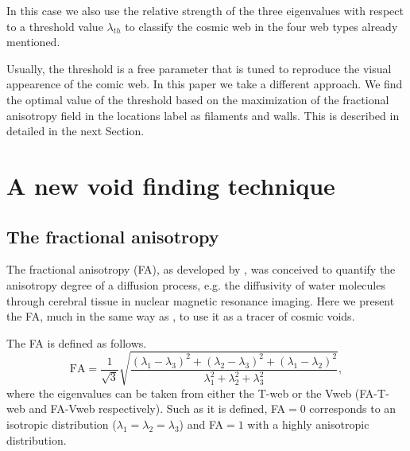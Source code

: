 \documentclass[a4,useAMS,usenatbib,usegraphicx]{mn2e}
\newcommand{\eq}[2]{\begin{equation} \label{eq:#1} #2 \end{equation}}
\begin{document}
In this case we also use the relative strength of the three eigenvalues with 
respect to a threshold value $\lambda_{th}$ to classify the cosmic web
in the four web types already mentioned.

Usually, the threshold is a free parameter that is tuned to reproduce
the visual appearence of the comic web. 
In this paper we take a different approach.
We find the optimal value of the threshold based on the maximization
of the fractional anisotropy field in the locations label as filaments
and walls. 
This is described in detailed in the next Section.



\section{A new void finding technique}
\label{sec:bulk_voids}


\subsection{The fractional anisotropy}
\label{subsec:FA_voids}


The fractional anisotropy (FA), as developed by \citet{Basser95}, was 
conceived to quantify the anisotropy degree of a diffusion process, e.g. 
the diffusivity of water molecules through cerebral tissue in nuclear
magnetic resonance imaging. 
Here we present the FA, much in the same way as \citet{Libeskind13},
to use it as a tracer of cosmic voids.


The FA is defined as follows.
\eq{fractional_anisotropy}
{{\mathrm{FA}} = \frac{1}{\sqrt{3}}\sqrt{ \frac{ (\lambda_1 - \lambda_3)^2 + 
(\lambda_2 - \lambda_3)^2 + (\lambda_1 - \lambda_2)^2}{ \lambda_1^2 + 
\lambda_2^2 + \lambda_3^2} },}
where the eigenvalues can be taken from either the T-web or the Vweb 
(FA-T-web and FA-Vweb respectively). Such as it is defined, FA$=0$ 
corresponds to an isotropic distribution ($\lambda_1=\lambda_2=\lambda_3$) 
and FA$=1$ with a highly anisotropic distribution.
\end{document}
